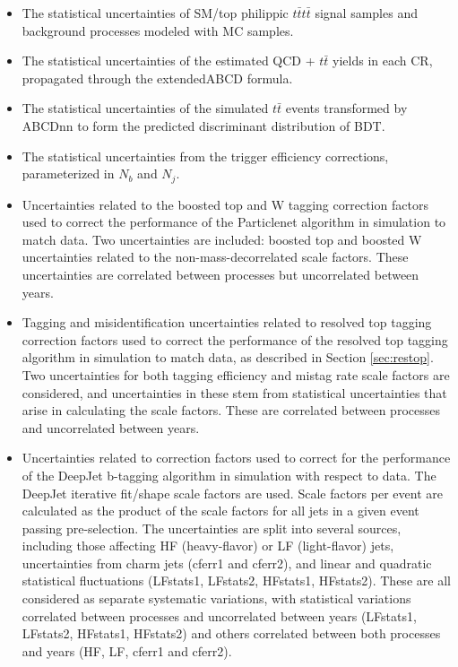 \documentclass[twoside]{article}
\begin{document}
\begin{itemize}
    \item The statistical uncertainties of SM/top philippic $t\bar{t}t\bar{t}$ signal samples and background processes modeled with MC samples.
    \item The statistical uncertainties of the estimated QCD + $t\bar{t}$ yields in each CR, propagated through the extendedABCD formula.
    \item The statistical uncertainties of the simulated $t\bar{t}$ events transformed by ABCDnn to form the predicted discriminant distribution of BDT.
    \item The statistical uncertainties from the trigger efficiency corrections, parameterized in $N_b$ and $N_j$.
    \item Uncertainties related to the boosted top and W tagging correction factors used to correct the performance of the Particlenet algorithm in simulation to match data. Two uncertainties are included: boosted top and boosted W uncertainties related to the non-mass-decorrelated scale factors. These uncertainties are correlated between processes but uncorrelated between years.
    \item Tagging and misidentification uncertainties related to resolved top tagging correction factors used to correct the performance of the resolved top tagging algorithm in simulation to match data, as described in Section \ref{sec:restop}. Two uncertainties for both tagging efficiency and mistag rate scale factors are considered, and uncertainties in these stem from statistical uncertainties that arise in calculating the scale factors. These are correlated between processes and uncorrelated between years.
    \item Uncertainties related to correction factors used to correct for the performance of the DeepJet b-tagging algorithm in simulation with respect to data. The DeepJet iterative fit/shape scale factors are used. Scale factors per event are calculated as the  product of the scale factors for all jets in a given event passing pre-selection. The uncertainties are split into several sources, including those affecting HF (heavy-flavor) or LF (light-flavor) jets, uncertainties from charm jets (cferr1 and cferr2), and linear and quadratic statistical fluctuations (LFstats1, LFstats2, HFstats1, HFstats2). These are all considered as separate systematic variations, with statistical variations correlated between processes and uncorrelated between years (LFstats1, LFstats2, HFstats1, HFstats2) and others correlated between both processes and years (HF, LF, cferr1 and cferr2).

\end{itemize}
\end{document}
